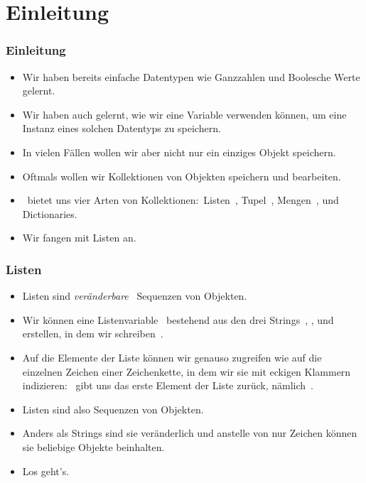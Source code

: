 \documentclass[aspectratio=169,mathserif,notheorems]{beamer}%
\subtitle{17.~Listen}%
\begin{document}
%
%
\startPresentation%
%
\section{Einleitung}%
\begin{frame}%
\frametitle{Einleitung}%
\begin{itemize}%
\item Wir haben bereits einfache Datentypen wie Ganzzahlen und Boolesche Werte gelernt.%
%
\item<2-> Wir haben auch gelernt, wie wir eine Variable verwenden können, um eine Instanz eines solchen Datentyps zu speichern.%
%
\item<3-> In vielen Fällen wollen wir aber nicht nur ein einziges Objekt speichern.%
%
\item<4-> Oftmals wollen wir Kollektionen von Objekten speichern und bearbeiten.%
%
\item<5-> \python\ bietet uns vier Arten von Kollektionen:~Listen~, Tupel~, Mengen~, und Dictionaries.%
%
\item<6-> Wir fangen mit Listen an.%
%
\end{itemize}%
\end{frame}%
%
\begin{frame}%
\frametitle{Listen}%
\begin{itemize}%
\item Listen sind \emph{veränderbare}~ Sequenzen von Objekten.%
\item<2-> Wir können eine Listenvariable~ bestehend aus den drei Strings~, , und~ erstellen, in dem wir schreiben~.%
\item<3-> Auf die Elemente der Liste können wir genauso zugreifen wie auf die einzelnen Zeichen einer Zeichenkette, in dem wir sie mit eckigen Klammern indizieren:~ gibt uns das erste Element der Liste zurück, nämlich~.
\item<4-> Listen sind also Sequenzen von Objekten.%
\item<5-> Anders als Strings sind sie veränderlich und anstelle von nur Zeichen können sie beliebige Objekte beinhalten.%
\item<6-> Los geht's.%
\end{itemize}%
\end{frame}%
%
\end{document}
